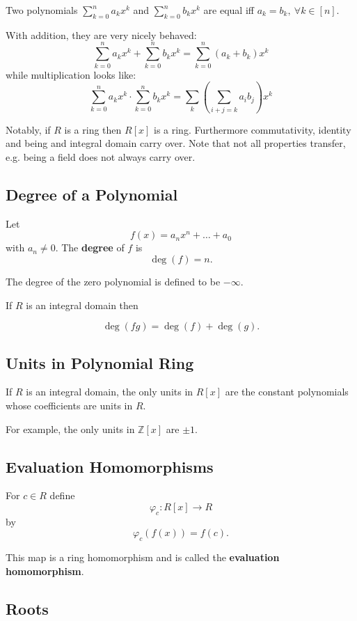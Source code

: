 Two polynomials $\sum_{k=0}^{n}a_kx^k$ and $\sum_{k=0}^{n}b_kx^k$
are equal iff $a_k = b_k, \: \forall k \in [n]$. 

With addition, they are very nicely behaved: 
\[
    \displaystyle\sum_{k=0}^{n}a_kx^k + 
    \displaystyle\sum_{k=0}^{n}b_kx^k = 
    \displaystyle\sum_{k=0}^{n}(a_k+b_k)x^k
\]
while multiplication looks like: 
\[
    \displaystyle\sum_{k=0}^{n}a_kx^k \cdot 
    \displaystyle\sum_{k=0}^{n}b_kx^k = 
    \displaystyle\sum_k\left(
    \displaystyle\sum_{i+j=k}a_ib_j
    \right)x^k
\]

Notably, if $R$ is a ring then $R[x]$ is a ring. Furthermore 
commutativity, identity and being and integral domain 
carry over. Note that not all properties transfer, e.g. 
being a field does not always carry over. 

\subsection{Degree of a Polynomial}

\begin{defn}
Let 
\[
f(x) = a_n x^n + \dots + a_0
\]
with $a_n \neq 0$. The \textbf{degree} of $f$ is
\[
\deg(f) = n .
\]

The degree of the zero polynomial is defined to be $-\infty$.
\end{defn}

If $R$ is an integral domain then

\[
\deg(fg) = \deg(f) + \deg(g).
\]

\subsection{Units in Polynomial Ring}

If $R$ is an integral domain, the only units in $R[x]$ are 
the constant polynomials whose coefficients are units in $R$.

For example, the only units in $\mathbb{Z}[x]$ are $\pm 1$.

\subsection{Evaluation Homomorphisms}

For $c \in R$ define
\[
\varphi_c : R[x] \to R
\]
by
\[
\varphi_c(f(x)) = f(c).
\]

This map is a ring homomorphism and is called the 
\textbf{evaluation homomorphism}.

\subsection{Roots}

